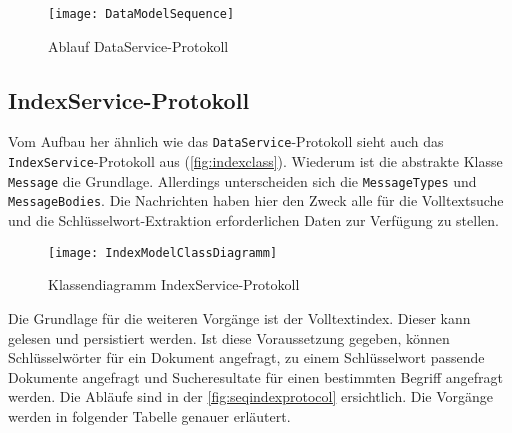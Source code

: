     \begin{figure}[H]
    \centering
    \texttt{[image: DataModelSequence]}
    \caption{Ablauf DataService-Protokoll}
    \label{fig:seqdataprotocol}
    \end{figure}


\subsection{IndexService-Protokoll}

Vom Aufbau her ähnlich wie das \texttt{DataService}-Protokoll sieht auch das \texttt{IndexService}-Protokoll aus (\autoref{fig:indexclass}). Wiederum ist die abstrakte Klasse \texttt{Message} die Grundlage. Allerdings unterscheiden sich die \texttt{Mes\-sa\-ge\-Typ\-es} und \texttt{MessageBodies}. Die Nachrichten haben hier den Zweck alle für die Volltextsuche und die Schlüs\-sel\-wort-\-Ex\-trak\-tion erforderlichen Daten zur Verfügung zu stellen.

    
    \begin{figure}[H]
    \centering
    \texttt{[image: IndexModelClassDiagramm]}
    \caption{Klassendiagramm IndexService-Protokoll}
    \label{fig:indexclass}
    \end{figure}

Die Grundlage für die weiteren Vorgänge ist der Volltextindex. Dieser kann gelesen und persistiert werden. Ist diese Voraussetzung gegeben, können Schlüsselwörter für ein Dokument angefragt, zu einem Schlüsselwort passende Dokumente angefragt und Sucheresultate für einen bestimmten Begriff angefragt werden. Die Abläufe sind in der \autoref{fig:seqindexprotocol} ersichtlich. Die Vorgänge werden in folgender Tabelle genauer erläutert.

